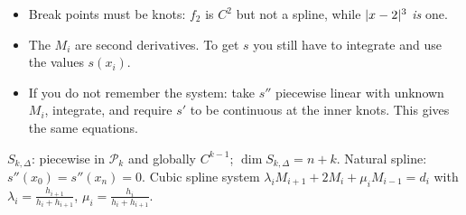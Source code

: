 \begin{solution}
\begin{trap}
\begin{itemize}
\item Break points must be knots: $f_2$ is $C^2$ but not a spline, while $\lvert x-2\rvert^3$ \emph{is} one.
\item The $M_i$ are second derivatives. To get $s$ you still have to integrate and use the values $s(x_i)$.
\item If you do not remember the system: take $s''$ piecewise linear with unknown $M_i$, integrate, and require $s'$ to be continuous at the inner knots. This gives the same equations.
\end{itemize}
\end{trap}
\begin{heart}
$S_{k,\Delta}$: piecewise in $\mathcal P_k$ and globally $C^{k-1}$; $\dim S_{k,\Delta}=n+k$. Natural spline: $s''(x_0)=s''(x_n)=0$. Cubic spline system $\lambda_iM_{i+1}+2M_i+\mu_iM_{i-1}=d_i$ with $\lambda_i=\frac{h_{i+1}}{h_i+h_{i+1}}$, $\mu_i=\frac{h_i}{h_i+h_{i+1}}$.
\end{heart}
\end{solution}


